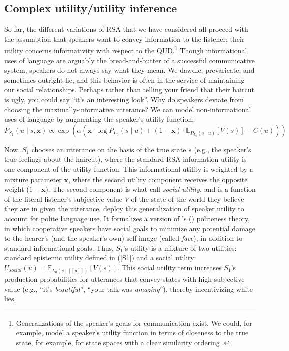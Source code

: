 \documentclass{sp}
\newcommand{\sem}[1]{\ensuremath{[\![#1]\!]}}
\begin{document}
\subsection{Complex utility/utility inference}
\label{sec:compl-util-infer}
 
 So far, the different variations of RSA that we have considered all proceed with the assumption that speakers want to convey information to the listener; their utility concerns informativity with respect to the QUD.\footnote{Generalizations of the speaker's goals for communication exist. We could, for example, model a speaker's utility function in terms of closeness to the true state, for example, for state spaces with a clear similarity ordering \citep{Franke2014:Typical-use-of-}.} Though informational uses of language are arguably the bread-and-butter of a successful communicative system, speakers do not always say what they mean. We dawdle, prevaricate, and sometimes outright lie, and this behavior is often in the service of maintaining our social relationships. Perhaps rather than telling your friend that their haircut is ugly, you could say ``it's an interesting look''. Why do speakers deviate from choosing the maximally-informative utterance? We can model non-informational uses of language by augmenting the speaker's utility function: 
%
 \begin{equation} \label{S1-polite}
P_{S_1}(u \mid s, \textbf{x}) \propto \exp (\alpha  (
 \textbf{x} \cdot \log P_{L_0}(s \mid u) +
 (1 - \textbf{x}) \cdot  \mathbb{E}_{P_{L_0}(s \mid u)}[V(s)] - C(u)))
\end{equation}

Now, $S_1$ chooses an utterance on the basis of the true state $s$ (e.g., the speaker's true feelings about the haircut), where the standard RSA information utility is one component of the utility function. 
This informational utility is weighted by a mixture parameter $\textbf{x}$, where the second utility component receives the opposite weight ($1-\textbf{x}$).
The second component is what \cite{yoonetal2016} call \emph{social utility}, and is a function of the literal listener's subjective value $V$ of the state of the world they believe they are in given the utterance.
\cite{yoonetal2016} deploy this generalization of speaker utility to account for polite language use. 
It formalizes a version of \citeauthor{brown1987politeness}'s (\citeyear{brown1987politeness}) politeness theory, in which cooperative speakers have social goals to minimize any potential damage to the hearer’s (and the speaker’s own) self-image (called \emph{face}), in addition to standard informational goals.
Thus, $S_1$'s utility is a mixture of two-utilities: standard epistemic utility defined in (\ref{S1}) and a social utility: $U_{social}(u)  =  \mathbb{E}_{L_0(s \mid \sem{u})}[V(s)]$. 
This social utility term increases $S_1$'s production probabilities for utterances that convey states with high subjective value (e.g., ``it's \emph{beautiful}'', ``your talk was \emph{amazing}''), thereby incentivizing white lies. 
\end{document}
